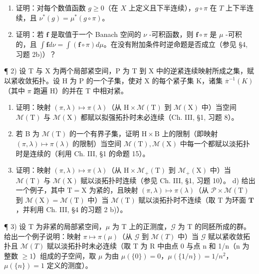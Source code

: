 \begin{enumerate}
\def\labelenumi{\alph{enumi})}
\item
  证明：对每个数值函数 \(g \geqslant 0\)（在 \(X\) 上定义且下半连续），\(g \circ \pi\) 在 \(T\) 上下半连续，且 \(\nu^{*}(g) = \mu^{*}(g \circ \pi)\)。
\item
  证明：若 \(\mathbf{f}\) 是取值于一个 Banach 空间的 \(\nu\) -可积函数，则 \(\mathbf{f} \circ \pi\) 是 \(\mu\) -可积的，且 \(\int \mathbf{f} d\nu = \int (\mathbf{f} \circ \pi) d\mu\)。在没有附加条件时逆命题是否成立（参见 §4, 习题 2b)）？
\end{enumerate}

¶ 2) 设 T 与 X 为两个局部紧空间，P 为 T 到 X 中的逆紧连续映射所成之集，赋以紧收敛拓扑。设 H 为 P 的一个子集，使对 X 的每个紧子集 K，诸集 \(\overline{\pi}^{-1}(K)\)（其中 \(\pi\) 跑遍 H）的并在 T 中相对紧。

\begin{enumerate}
\def\labelenumi{\alph{enumi})}
\item
  证明：映射 \((\pi, \lambda) \mapsto \pi(\lambda)\)（从 \(\mathrm{H} \times \mathcal{M}(\mathrm{T})\) 到 \(\mathcal{M}(\mathrm{X})\) 中）当空间 \(\mathcal{M}(\mathrm{T})\) 与 \(\mathcal{M}(\mathrm{X})\) 都赋以拟强拓扑时未必连续（Ch. III, §1, 习题 8）。
\item
  若 B 为 \(\mathcal{M}(\mathrm{T})\) 的一个有界子集，证明 \(\mathrm{H} \times \mathrm{B}\) 上的限制（即映射 \((\pi, \lambda) \mapsto \pi(\lambda)\) 的限制）当空间 \(\mathcal{M}(\mathrm{T}), \mathcal{M}(\mathrm{X})\) 中每一个都赋以淡拓扑时是连续的（利用 Ch. III, §1 的命题 15）。
\item
  证明：映射 \((\pi, \lambda) \mapsto \pi(\lambda)\)（从 \(\mathrm{H} \times \mathcal{M}_{+}(\mathrm{T})\) 到 \(\mathcal{M}_{+}(\mathrm{X})\) 中）当 \(\mathcal{M}(\mathrm{T})\) 与 \(\mathcal{M}(\mathrm{X})\) 赋以淡拓扑时连续（参见 Ch. III, §1, 习题 10）。 d) 给出一个例子，其中 \(\mathrm{T} = \mathrm{X}\) 为紧的，且映射 \((\pi, \lambda) \mapsto \pi(\lambda)\)（从 \(\mathcal{P} \times \mathcal{M}(\mathrm{T})\) 到 \(\mathcal{M}(\mathrm{X}) = \mathcal{M}(\mathrm{T})\) 中）当 \(\mathcal{M}(\mathrm{T})\) 赋以淡拓扑时不连续（取 \(\mathrm{T}\) 为环面 \(\mathbf{T}\)，并利用 Ch. III, §4 的习题 2 b)）。
\end{enumerate}

¶ 3) 设 T 为非紧的局部紧空间，\(\mu\) 为 T 上的正测度，\(\mathcal{G}\) 为 T 的同胚所成的群。给出一个例子说明：映射 \(\pi \mapsto \pi(\mu)\)（从 \(\mathcal{G}\) 到 \(\mathcal{M}(T)\) 中）当 \(\mathcal{G}\) 赋以紧收敛拓扑且 \(\mathcal{M}(T)\) 赋以淡拓扑时未必连续（取 T 为 R 中由点 0 与点 n 和 1/n（n 为整数 \(\geqslant 1\)）组成的子空间，取 \(\mu\) 为由 \(\mu(\{0\}) = 0\)，\(\mu(\{1/n\}) = 1/n^2\)，\(\mu(\{n\}) = 1\) 定义的测度）。

